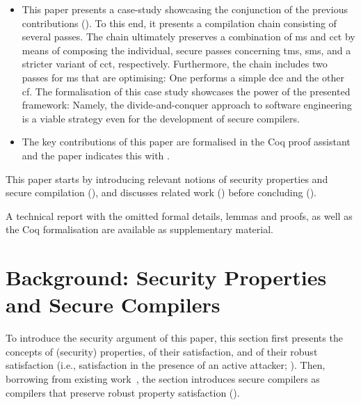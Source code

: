 \documentclass[utf8,acmsmall,review,screen,dvipsnames,anonymous]{acmart}
\begin{document}
\begin{itemize}
  \item %
        This paper presents a case-study showcasing the conjunction of the previous contributions ().
        To this end, it presents a compilation chain consisting of several passes.
        The chain ultimately preserves a combination of \gls{ms} and \gls{cct} by means of composing the individual, secure passes concerning \gls{tms}, \gls{sms}, and a stricter variant of \gls{cct}, respectively.
        Furthermore, the chain includes two passes for \gls{ms} that are optimising: One performs a simple \gls{dce} and the other \gls{cf}.
        The formalisation of this case study showcases the power of the presented framework: Namely, the divide-and-conquer approach to software engineering is a viable strategy even for the development of secure compilers.

  \item The key contributions of this paper are formalised in the Coq proof assistant and the paper indicates this with \CoqSymbol.
\end{itemize}

This paper starts by introducing relevant notions of security properties and secure compilation (),
and discusses related work () before concluding ().

 A technical report with the omitted formal details, lemmas and proofs, as well as the Coq formalisation are available as supplementary material.


\section{Background: Security Properties and Secure Compilers}\label{sec:background}

To introduce the security argument of this paper, this section first presents the concepts of (security) properties, of their satisfaction, and of their robust satisfaction (i.e., satisfaction in the presence of an active attacker; ).
Then, borrowing from existing work~\cite{abate2019jour,abate2021extacc,patrignani2021rsc}, the section introduces secure compilers as compilers that preserve robust property satisfaction ().
\end{document}
